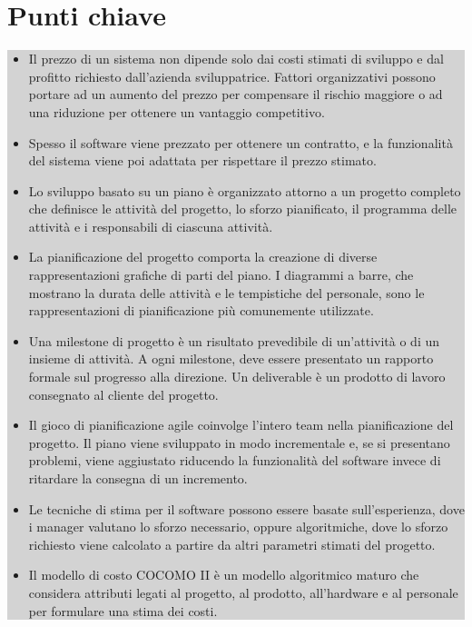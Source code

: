 \section{Punti chiave}
\begin{center}
\begin{minipage}{\textwidth}
\colorbox{lightgray}{
\parbox{\linewidth}{
\begin{itemize} 
    \item Il prezzo di un sistema non dipende solo dai costi stimati di sviluppo e dal profitto richiesto dall'azienda sviluppatrice. Fattori organizzativi possono portare ad un aumento del prezzo per compensare il rischio maggiore o ad una riduzione per ottenere un vantaggio competitivo.
    \item Spesso il software viene prezzato per ottenere un contratto, e la funzionalità del sistema viene poi adattata per rispettare il prezzo stimato.
    \item Lo sviluppo basato su un piano è organizzato attorno a un progetto completo che definisce le attività del progetto, lo sforzo pianificato, il programma delle attività e i responsabili di ciascuna attività.
    \item La pianificazione del progetto comporta la creazione di diverse rappresentazioni grafiche di parti del piano. I diagrammi a barre, che mostrano la durata delle attività e le tempistiche del personale, sono le rappresentazioni di pianificazione più comunemente utilizzate.
    \item Una milestone di progetto è un risultato prevedibile di un'attività o di un insieme di attività. A ogni milestone, deve essere presentato un rapporto formale sul progresso alla direzione. Un deliverable è un prodotto di lavoro consegnato al cliente del progetto.
    \item Il gioco di pianificazione agile coinvolge l'intero team nella pianificazione del progetto. Il piano viene sviluppato in modo incrementale e, se si presentano problemi, viene aggiustato riducendo la funzionalità del software invece di ritardare la consegna di un incremento.
    \item Le tecniche di stima per il software possono essere basate sull'esperienza, dove i manager valutano lo sforzo necessario, oppure algoritmiche, dove lo sforzo richiesto viene calcolato a partire da altri parametri stimati del progetto.
    \item Il modello di costo COCOMO II è un modello algoritmico maturo che considera attributi legati al progetto, al prodotto, all'hardware e al personale per formulare una stima dei costi.
\end{itemize}
}}
\end{minipage}
\end{center}